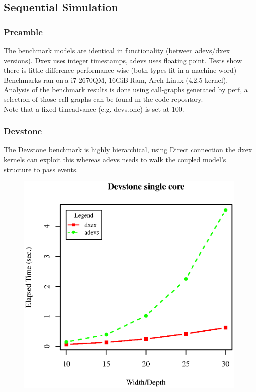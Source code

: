 \subsection{Sequential Simulation}
\subsubsection{Preamble}
The benchmark models are identical in functionality (between adevs/dxex versions). Dxex uses integer timestamps, adevs uses floating point. Tests show there is little difference performance wise (both types fit in a machine word)\\
Benchmarks ran on a i7-2670QM, 16GiB Ram, Arch Linux (4.2.5 kernel). Analysis of the benchmark results is done using call-graphs generated by perf, a selection of those call-graphs can be found in the code repository. \\
Note that a fixed timeadvance (e.g. devstone) is set at 100.
\subsubsection{Devstone}
The Devstone \cite{DEVStone} benchmark is highly hierarchical, using Direct connection the dxex kernels can exploit this whereas adevs needs to walk the coupled model's structure to pass events.\\
\begin{figure}[h]
	\includegraphics[width=.5\textwidth]{fig/fig1.eps}
	\label{fig1.eps}
\end{figure}

